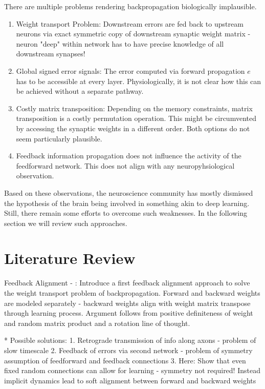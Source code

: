 \documentclass[colorinlistoftodos]{article}
\theoremstyle{definition}
\begin{document}
There are multiple problems rendering backpropagation biologically implausible. 

\begin{enumerate}
	\item Weight transport Problem: Downstream errors are fed back to upstream neurons via exact symmetric copy of downstream synaptic weight matrix - neuron "deep" within network has to have precise knowledge of all downstream synapses!
	\item Global signed error signals: The error computed via forward propagation $e$ has to be accessible at every layer.  Physiologically, it is not clear how this can be achieved without a separate pathway.
	\item Costly matrix transposition: Depending on the memory constraints, matrix transposition is a costly permutation operation. This might be circumvented by accessing the synaptic weights in a different order. Both options do not seem particularly plausible.
	\item Feedback information propagation does not influence the activity of the feedforward network. This does not align with any neuropyhsiological observation.
\end{enumerate}

Based on these observations, the neuroscience community has mostly dismissed the hypothesis of the brain being involved in something akin to deep learning. Still, there remain some efforts to overcome such weaknesses. In the following section we will review such approaches.

\newpage
\section{Literature Review}

Feedback Alignment - \citet{lillicrap2016}: Introduce a first feedback alignment approach to solve the weight transport problem of backpropagation. Forward and backward weights are modeled separately - backward weights align with weight matrix transpose through learning process. Argument follows from positive definiteness of weight and random matrix product and a rotation line of thought.

* Possible solutions:
    1. Retrograde transmission of info along axons - problem of slow timescale
    2. Feedback of errors via second network - problem of symmetry assumption of feedforward and feedback connections
    3. Here: Show that even fixed random connections can allow for learning - symmetry not required! Instead implicit dynamics lead to soft alignment between forward and backward weights
\end{document}
